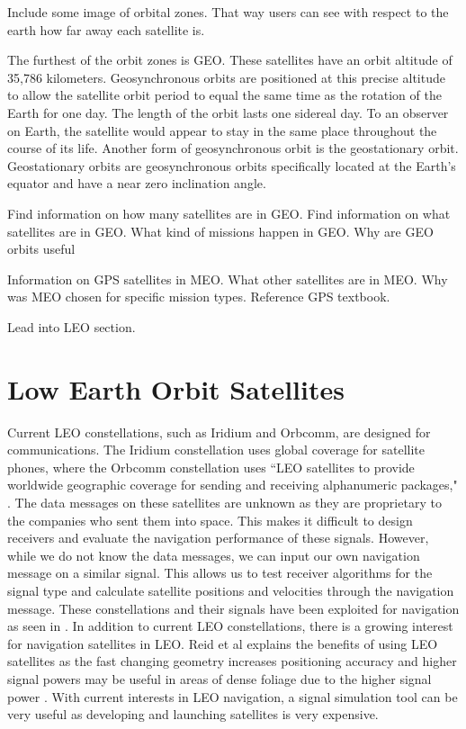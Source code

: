 \documentclass[12pt]{report}
\begin{document}
Include some image of orbital zones. That way users can see with respect to the earth how far away each satellite is. 


The furthest of the orbit zones is GEO. These satellites have an orbit altitude of 35,786 kilometers. Geosynchronous orbits are positioned at this precise altitude to allow the satellite orbit period to equal the same time as the rotation of the Earth for one day. The length of the orbit lasts one sidereal day. To an observer on Earth, the satellite would appear to stay in the same place throughout the course of its life. Another form of geosynchronous orbit is the geostationary orbit. Geostationary orbits are geosynchronous orbits specifically located at the Earth's equator and have a near zero inclination angle. 

Find information on how many satellites are in GEO. Find information on what satellites are in GEO. What kind of missions happen in GEO. Why are GEO orbits useful 


Information on GPS satellites in MEO. What other satellites are in MEO. Why was MEO chosen for specific mission types. Reference GPS textbook. 

Lead into LEO section. 

\section{Low Earth Orbit Satellites}
Current LEO constellations, such as Iridium and Orbcomm, are designed for communications. The Iridium constellation uses global coverage for satellite phones, where the Orbcomm constellation uses ``LEO satellites to provide worldwide geographic coverage for sending and receiving alphanumeric packages," \cite{orabiOpportunisticNavigationDoppler2021}. The data messages on these satellites are unknown as they are proprietary to the companies who sent them into space. This makes it difficult to design receivers and evaluate the navigation performance of these signals. However, while we do not know the data messages, we can input our own navigation message on a similar signal. This allows us to test receiver algorithms for the signal type and calculate satellite positions and velocities through the navigation message. These constellations and their signals have been exploited for navigation as seen in \cite{orabiOpportunisticNavigationDoppler2021}. In addition to current LEO constellations, there is a growing interest for navigation satellites in LEO. Reid et al explains the benefits of using LEO satellites as the fast changing geometry increases positioning accuracy and higher signal powers may be useful in areas of dense foliage due to the higher signal power \cite{reidSatelliteNavigationAge2020}. With current interests in LEO navigation, a signal simulation tool can be very useful as developing and launching satellites is very expensive.
\end{document}
